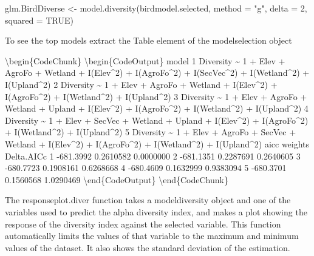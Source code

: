 \documentclass[article]{jss}
\begin{document}
\begin{CodeChunk}
\begin{CodeInput}
glm.BirdDiverse <- model.diversity(birdmodel.selected, method = "g", delta = 2, 
squared = TRUE)
\end{CodeInput}
\end{CodeChunk}

To see the top models extract the Table element of the modelselection
object

\textbackslash{}begin\{CodeChunk\} \textbackslash{}begin\{CodeOutput\}
model 1 Diversity \textasciitilde{} 1 + Elev + AgroFo + Wetland +
I(Elev\^{}2) + I(AgroFo\^{}2) + I(SecVec\^{}2) + I(Wetland\^{}2) +
I(Upland\^{}2) 2 Diversity \textasciitilde{} 1 + Elev + AgroFo + Wetland
+ I(Elev\^{}2) + I(AgroFo\^{}2) + I(Wetland\^{}2) + I(Upland\^{}2) 3
Diversity \textasciitilde{} 1 + Elev + AgroFo + Wetland + Upland +
I(Elev\^{}2) + I(AgroFo\^{}2) + I(Wetland\^{}2) + I(Upland\^{}2) 4
Diversity \textasciitilde{} 1 + Elev + SecVec + Wetland + Upland +
I(Elev\^{}2) + I(AgroFo\^{}2) + I(Wetland\^{}2) + I(Upland\^{}2) 5
Diversity \textasciitilde{} 1 + Elev + AgroFo + SecVec + Wetland +
I(Elev\^{}2) + I(AgroFo\^{}2) + I(Wetland\^{}2) + I(Upland\^{}2) aicc
weights Delta.AICc 1 -681.3992 0.2610582 0.0000000 2 -681.1351 0.2287691
0.2640605 3 -680.7723 0.1908161 0.6268668 4 -680.4609 0.1632999
0.9383094 5 -680.3701 0.1560568 1.0290469
\textbackslash{}end\{CodeOutput\} \textbackslash{}end\{CodeChunk\}

The responseplot.diver function takes a modeldiversity object and one of
the variables used to predict the alpha diversity index, and makes a
plot showing the response of the diversity index against the selected
variable. This function automatically limits the values of that variable
to the maximum and minimum values of the dataset. It also shows the
standard deviation of the estimation.
\end{document}
